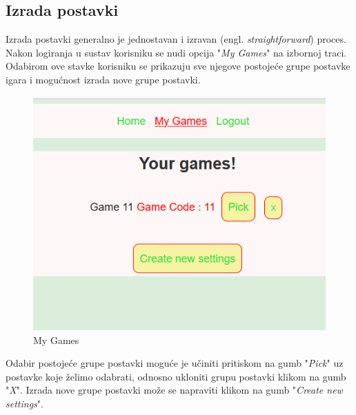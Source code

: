 \documentclass[times, utf8, zavrsni, numeric]{fer}
\begin{document}
	\subsection{Izrada postavki}
	Izrada postavki generalno je jednostavan i izravan (engl. \textit{straightforward}) proces. Nakon logiranja u sustav korisniku se nudi opcija "\textit{My Games}" na izbornoj traci. Odabirom ove stavke korisniku se prikazuju sve
	njegove postojeće grupe postavke igara i mogućnost izrada nove grupe postavki. 
	
		\begin{figure}[H]
			\includegraphics[scale = 0.7]{"slike/izradapostavki.png"} 
			\centering
			\caption{My Games}
			\label{fig:izradapostavki}
		\end{figure}
	
	Odabir postojeće grupe postavki moguće je učiniti pritiskom na gumb "\textit{Pick}" uz postavke koje želimo odabrati, odnosno ukloniti grupu postavki klikom na  gumb "\textit{X}". Izrada nove grupe postavki može se napraviti klikom na gumb
	 "\textit{Create new settings}". 
	 
\end{document}

